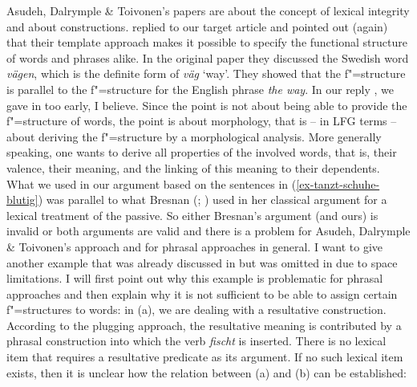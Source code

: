 Asudeh, Dalrymple \& Toivonen's papers are about the concept of lexical integrity and about
constructions. \citet{AT2014a} replied to our target article and pointed out (again) that their
template approach makes it possible to specify the functional structure of words and phrases
alike. In the original paper they discussed the Swedish word \emph{vägen}, which is the definite
form of \emph{väg} `way'. They showed that the f"=structure is parallel to the f"=structure for the
English phrase \emph{the way}. 
In our reply \citeyearpar{MWArgStReply}, we gave in too early, I believe. Since the point is
not about being able to provide the f"=structure of words, the point is about morphology, that is
-- in LFG terms -- about deriving the f"=structure by a morphological analysis. More generally
speaking, one wants to derive all properties of the involved words, that is, their valence, their
meaning, and the linking of this meaning to their dependents. What we used in our argument based on
the sentences in (\ref{ex-tanzt-schuhe-blutig}) was parallel to what Bresnan (\citeyear[]{Bresnan82a}; \citeyear[]{Bresnan2001a}) used in her classical argument for a lexical
treatment of the passive. So either Bresnan's argument (and ours) is invalid or both arguments are valid and there is a problem
for Asudeh, Dalrymple \& Toivonen's approach and for phrasal approaches in general. I want to
give another example that was already discussed in  but was omitted in
 due to space limitations. I will first point out why this example is problematic for
phrasal approaches and then explain why it is not sufficient to be able to assign certain
f"=structures to words: in (a), we are dealing with a resultative construction.
According to the plugging approach, the resultative meaning is contributed by a phrasal construction into which the
verb \emph{fischt} is inserted. There is no lexical item that requires a resultative predicate as
its argument. If no such lexical item exists, then it is unclear how the relation between (a)
and (b) can be established: 

